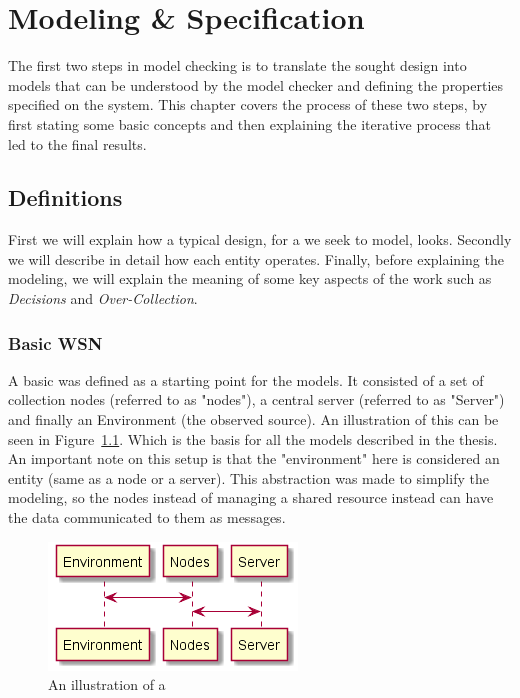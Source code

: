 \chapter{Modeling \& Specification}

The first two steps in model checking is to translate the sought design into models that can be understood by the model checker and defining the properties specified on the system. This chapter covers the process of these two steps, by first stating some basic concepts and then explaining the iterative process that led to the final results.

\section{Definitions}

First we will explain how a typical design, for a \wsn we seek to model, looks. Secondly we will describe in detail how each entity operates. Finally, before explaining the modeling, we will explain the meaning of some key aspects of the work such as \textit{Decisions} and \textit{Over-Collection}.

\subsection{Basic WSN}

A basic \wsn was defined as a starting point for the models. It consisted of a set of collection nodes (referred to as "nodes"), a central server (referred to as "Server") and finally an Environment (the observed source). An illustration of this can be seen in Figure~\ref{fig:basic_wsn}. Which is the basis for all the models described in the thesis. An important note on this setup is that the "environment" here is considered an entity (same as a node or a server). This abstraction was made to simplify the modeling, so the nodes instead of managing a shared resource instead can have the data communicated to them as messages.

\begin{figure}[ht]
    \includegraphics{include/figures/basic_wsn}
    \caption{An illustration of a \wsn}
    \label{fig:basic_wsn}
\end{figure}

